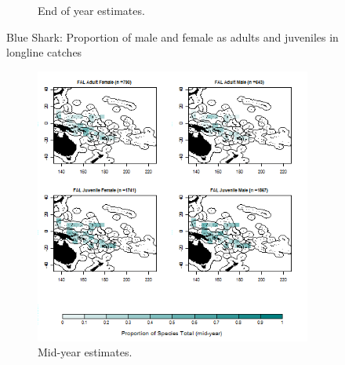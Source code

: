 \documentclass[12pt]{SCreport}
\begin{document}
\begin{landscape}
\begin{figure}
\begin{subfigure}[b]{0.6\textwidth}
       \caption{End of year estimates.}
       \label{fig:test2}
   \end{subfigure}
\caption{Blue Shark: Proportion of male and female as adults and juveniles in longline catches }
\label{fig:test} 
\end{figure}
\end{landscape}


\begin{landscape}
\begin{figure}
\centering
   \begin{subfigure}[b]{0.6\textwidth}
       \includegraphics[width=\textwidth]{../GRAPHICS/Defined/BI_22_Map_maturity_sex_FAL_MY}
       \caption{Mid-year estimates.}
       \label{fig:test1}
   \end{subfigure}
   \begin{subfigure}[b]{0.6\textwidth}

\end{subfigure}
\end{figure}
\end{landscape}
\end{document}
